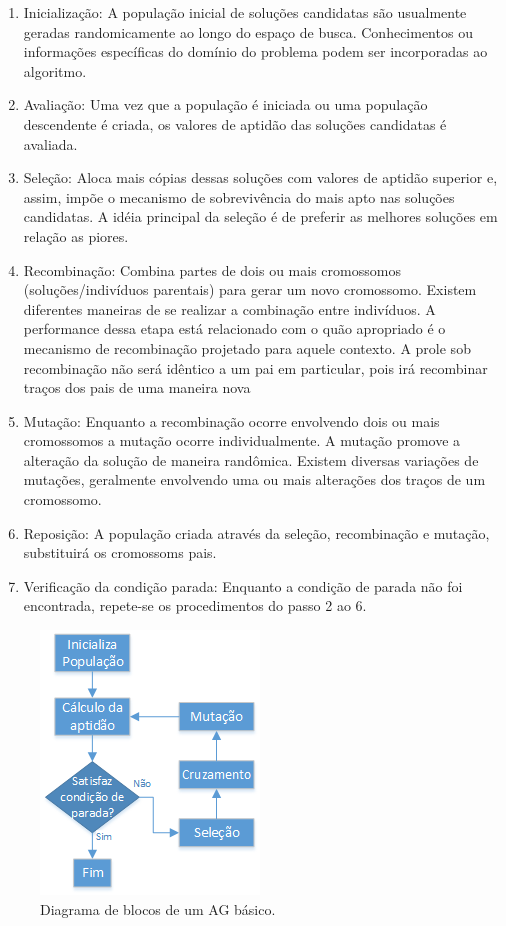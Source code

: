 \documentclass[twoside]{article}
\begin{document}
\begin{multicols}{2}
\begin{enumerate}
\setlength{\itemsep}{0.2cm}%
 \setlength{\parskip}{0.2cm}
\item Inicialização: A população inicial de soluções candidatas são usualmente geradas randomicamente ao longo do espaço de busca. Conhecimentos ou informações específicas do domínio do problema podem ser incorporadas ao algoritmo.
\item Avaliação: Uma vez que a população é iniciada ou uma população descendente é criada, os valores de aptidão das soluções candidatas é avaliada.
\item Seleção: Aloca mais cópias dessas soluções com valores de aptidão superior e, assim, impõe o mecanismo de sobrevivência do mais apto nas soluções candidatas. A idéia principal da seleção é de preferir as melhores soluções em relação as piores.
\item Recombinação: Combina partes de dois ou mais cromossomos (soluções/indivíduos parentais) para gerar um novo cromossomo. Existem diferentes maneiras de se realizar a combinação entre indivíduos. A performance dessa etapa está relacionado com o quão apropriado é o mecanismo de recombinação projetado para aquele contexto. A prole sob recombinação não será idêntico a um pai em particular, pois irá recombinar traços dos pais de uma maneira nova
\item Mutação: Enquanto a recombinação ocorre envolvendo dois ou mais cromossomos a mutação ocorre individualmente. A mutação promove a alteração da solução de maneira randômica. Existem diversas variações de mutações, geralmente envolvendo uma ou mais alterações dos traços de um cromossomo.
\item Reposição: A população criada através da seleção, recombinação e mutação, substituirá os cromossoms pais. 
\item Verificação da condição parada: Enquanto a condição de parada não foi encontrada, repete-se os procedimentos do passo 2 ao 6.
\end{enumerate}

\begin{figure}[H]
  \caption{Diagrama de blocos de um AG básico.}
  \centering
    \includegraphics[scale = 0.80]{basicga_diagram.png}
\end{figure}


\end{multicols}
\end{document}
